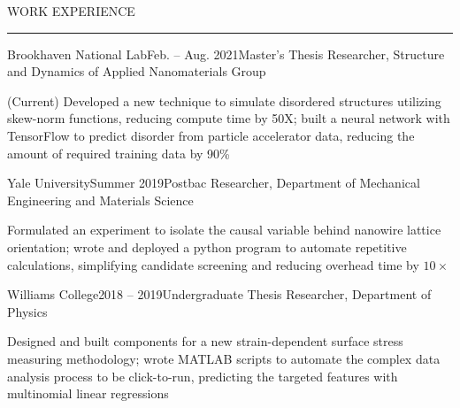 \documentclass{short_resume} %
\renewenvironment{rSection}[1]{
	\sectionskip
	\textcolor{RoyalPurple}{\MakeUppercase{#1}}
	\sectionlineskip
	\hrule
	\begin{list}{}{
			\setlength{\leftmargin}{1.5em}
		}
		\item[]
	}{
	\end{list}
}
\begin{document}
\vspace{-1em}		
	\begin{rSection}{Work Experience}
			\begin{rSubsection}{Brookhaven National Lab}{Feb. -- Aug. 2021}{Master's Thesis Researcher, Structure and Dynamics of Applied Nanomaterials Group}{}
			\item[] (Current) Developed a new technique to simulate disordered structures utilizing skew-norm functions, reducing compute time by 50X; built a neural network with TensorFlow to predict disorder from particle accelerator data, reducing the amount of required training data by 90\%
			\vspace{-.2em}
		\end{rSubsection}
		\vspace{-.2em}
		\begin{rSubsection}{Yale University}{Summer 2019}{Postbac Researcher, Department of Mechanical Engineering and Materials Science}{}
			\item[] Formulated an experiment to isolate the causal variable behind nanowire lattice orientation; wrote and deployed a python program to automate repetitive calculations, simplifying candidate screening and reducing overhead time by $10\times$
			\vspace{-.2em}
		\end{rSubsection}
		\vspace{-.2em}
		\begin{rSubsection}{Williams College}{2018 -- 2019}{Undergraduate Thesis Researcher, Department of Physics}{}
			\item[] Designed and built components for a new strain-dependent surface stress measuring methodology; wrote  MATLAB scripts to automate the complex data analysis process to be click-to-run, predicting the targeted features with multinomial linear regressions

\end{rSubsection}
\end{rSection}
\end{document}
